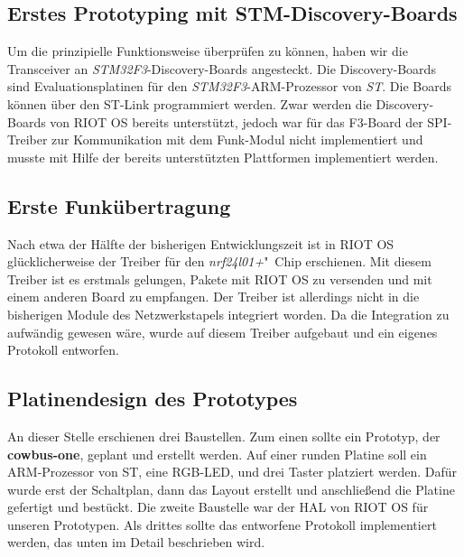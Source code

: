\documentclass{IEEEtran}
\begin{document}
    \subsection{Erstes Prototyping mit STM-Discovery-Boards}
    Um die prinzipielle Funktionsweise überprüfen zu können, haben wir die 
    Transceiver an \emph{STM32F3}-Discovery-Boards angesteckt. Die Discovery-Boards 
    sind Evaluationsplatinen für den \emph{STM32F3}-ARM-Prozessor von \emph{ST}. Die Boards 
    können über den ST-Link programmiert werden.
    Zwar werden die Discovery-Boards von RIOT OS bereits unterstützt, jedoch war 
    für das F3-Board der SPI-Treiber zur Kommunikation mit dem Funk-Modul nicht 
    implementiert und musste mit Hilfe der bereits unterstützten Plattformen
    implementiert werden.

    \subsection{Erste Funkübertragung}
        Nach etwa der Hälfte der bisherigen Entwicklungszeit ist in RIOT OS 
        glücklicherweise der Treiber für den \emph{nrf24l01+}"~Chip erschienen. Mit 
        diesem Treiber ist es erstmals gelungen, Pakete mit RIOT OS zu versenden 
        und mit einem anderen Board zu empfangen.
        Der Treiber ist allerdings nicht in die bisherigen Module des 
        Netzwerkstapels integriert worden. Da die Integration zu aufwändig 
        gewesen wäre, wurde auf diesem Treiber aufgebaut und ein eigenes 
        Protokoll entworfen.

    \subsection{Platinendesign des Prototypes}
    An dieser Stelle erschienen drei Baustellen. Zum einen sollte ein Prototyp, 
    der \textbf{cowbus-one}, geplant und erstellt werden. Auf einer runden Platine soll 
    ein ARM-Prozessor von ST, eine RGB-LED, und drei Taster platziert werden. 
    Dafür wurde erst der Schaltplan, dann das Layout erstellt und anschließend 
    die Platine gefertigt und bestückt.
    Die zweite Baustelle war der \ac{HAL} von RIOT OS 
    für unseren Prototypen. Als drittes sollte das entworfene Protokoll 
    implementiert werden, das unten im Detail beschrieben wird.

\end{document}
